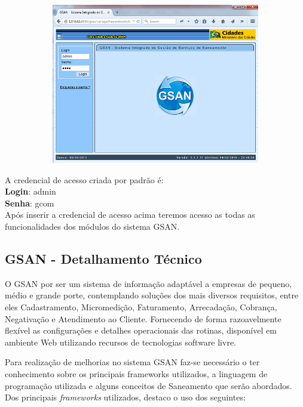 \begin{figure}[H]
	\centering
	\caption{Acessando página inicial do Sistema}
	\label{figura:acessoPaginaInicial}
	\begin{subfigure}[H]{\textwidth}
		\centering
	\includegraphics{figuras/gsan_online.png}	
	\end{subfigure}
\end{figure}	


A credencial de acesso criada por padrão é: \\
\textbf{Login}: admin \\
\textbf{Senha}: gcom \\
Após inserir a credencial de acesso acima teremos acesso as todas as funcionalidades dos módulos do sistema GSAN.


\subsection{GSAN - Detalhamento Técnico }

O GSAN por ser um sistema de informação adaptável a empresas de pequeno, médio e grande porte, contemplando soluções dos mais diversos requisitos, entre eles Cadastramento, Micromedição, Faturamento, Arrecadação, Cobrança, Negativação e Atendimento ao Cliente. Fornecendo de forma razoavelmente flexível as configurações e detalhes operacionais das rotinas, disponível em ambiente Web utilizando recursos de tecnologias software livre.

Para realização de melhorias no sistema GSAN faz-se necessário o ter conhecimento sobre os principais frameworks utilizados, a linguagem de programação utilizada e alguns conceitos de Saneamento que serão abordados.
Dos principais \textit{frameworks} utilizados, destaco o uso dos seguintes: \\

